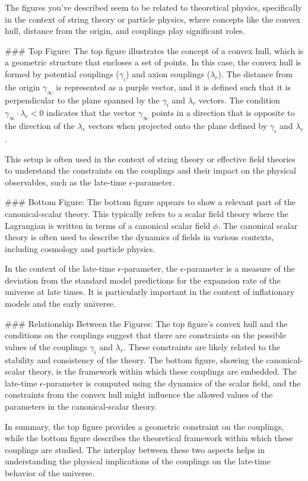 The figures you've described seem to be related to theoretical physics, specifically in the context of string theory or particle physics, where concepts like the convex hull, distance from the origin, and couplings play significant roles.

### Top Figure:
The top figure illustrates the concept of a convex hull, which is a geometric structure that encloses a set of points. In this case, the convex hull is formed by potential couplings (\(\gamma_i\)) and axion couplings (\(\lambda_r\)). The distance from the origin \(\gamma_\infty\) is represented as a purple vector, and it is defined such that it is perpendicular to the plane spanned by the \(\gamma_i\) and \(\lambda_r\) vectors. The condition \(\gamma_\infty \cdot \lambda_r < 0\) indicates that the vector \(\gamma_\infty\) points in a direction that is opposite to the direction of the \(\lambda_r\) vectors when projected onto the plane defined by \(\gamma_i\) and \(\lambda_r\).

This setup is often used in the context of string theory or effective field theories to understand the constraints on the couplings and their impact on the physical observables, such as the late-time \(\epsilon\)-parameter.

### Bottom Figure:
The bottom figure appears to show a relevant part of the canonical-scalar theory. This typically refers to a scalar field theory where the Lagrangian is written in terms of a canonical scalar field \( \phi \). The canonical scalar theory is often used to describe the dynamics of fields in various contexts, including cosmology and particle physics.

In the context of the late-time \(\epsilon\)-parameter, the \(\epsilon\)-parameter is a measure of the deviation from the standard model predictions for the expansion rate of the universe at late times. It is particularly important in the context of inflationary models and the early universe.

### Relationship Between the Figures:
The top figure's convex hull and the conditions on the couplings suggest that there are constraints on the possible values of the couplings \(\gamma_i\) and \(\lambda_r\). These constraints are likely related to the stability and consistency of the theory. The bottom figure, showing the canonical-scalar theory, is the framework within which these couplings are embedded. The late-time \(\epsilon\)-parameter is computed using the dynamics of the scalar field, and the constraints from the convex hull might influence the allowed values of the parameters in the canonical-scalar theory.

In summary, the top figure provides a geometric constraint on the couplings, while the bottom figure describes the theoretical framework within which these couplings are studied. The interplay between these two aspects helps in understanding the physical implications of the couplings on the late-time behavior of the universe.
